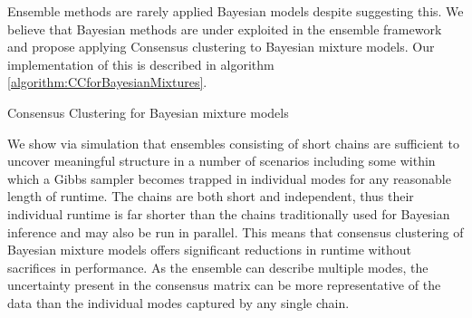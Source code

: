\documentclass[]{article}
\begin{document}
Ensemble methods are rarely applied Bayesian models despite \cite{monti2003consensus} suggesting this. We believe that Bayesian methods are under exploited in the ensemble framework and propose applying Consensus clustering to Bayesian mixture models. Our implementation of this is described in algorithm \ref{algorithm:CCforBayesianMixtures}.

\begin{algorithm} \label{algorithm:CCforBayesianMixtures}
	\caption{Consensus Clustering for Bayesian mixture models}
\end{algorithm}

We show via simulation that ensembles consisting of short chains are sufficient to uncover meaningful structure in a number of scenarios including some within which a Gibbs sampler becomes trapped in individual modes for any reasonable length of runtime. The chains are both short and independent, thus their individual runtime is far shorter than the chains traditionally used for Bayesian inference and may also be run in parallel. This means that consensus clustering of Bayesian mixture models offers significant reductions in runtime without sacrifices in performance. As the ensemble can describe multiple modes, the uncertainty present in the consensus matrix can be more representative of the data than the individual modes captured by any single chain.
\end{document}
